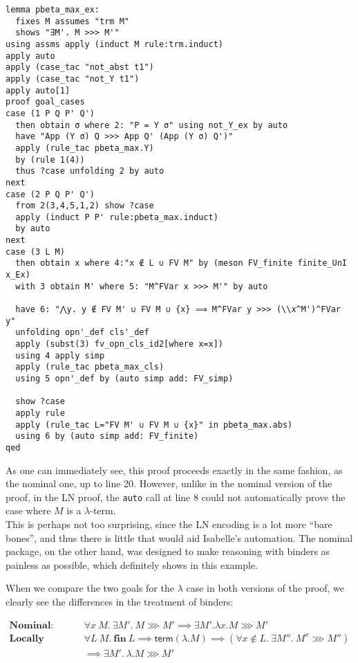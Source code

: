 \documentclass[a4paper, 12pt, twoside]{style/ociamthesis}
\theoremstyle{plain}
\theoremstyle{definition}
\theoremstyle{remark}
\newcommand{\trm}{\textsf{term}}
\begin{document}
\begin{verbatim}
lemma pbeta_max_ex:
  fixes M assumes "trm M"
  shows "∃M'. M >>> M'"
using assms apply (induct M rule:trm.induct)
apply auto
apply (case_tac "not_abst t1")
apply (case_tac "not_Y t1")
apply auto[1]
proof goal_cases
case (1 P Q P' Q')
  then obtain σ where 2: "P = Y σ" using not_Y_ex by auto
  have "App (Y σ) Q >>> App Q' (App (Y σ) Q')"
  apply (rule_tac pbeta_max.Y)
  by (rule 1(4))
  thus ?case unfolding 2 by auto
next
case (2 P Q P' Q')
  from 2(3,4,5,1,2) show ?case
  apply (induct P P' rule:pbeta_max.induct)
  by auto
next
case (3 L M)
  then obtain x where 4:"x ∉ L ∪ FV M" by (meson FV_finite finite_UnI x_Ex)
  with 3 obtain M' where 5: "M^FVar x >>> M'" by auto

  have 6: "⋀y. y ∉ FV M' ∪ FV M ∪ {x} ⟹ M^FVar y >>> (\\x^M')^FVar y"
  unfolding opn'_def cls'_def 
  apply (subst(3) fv_opn_cls_id2[where x=x])
  using 4 apply simp
  apply (rule_tac pbeta_max_cls)
  using 5 opn'_def by (auto simp add: FV_simp)

  show ?case
  apply rule
  apply (rule_tac L="FV M' ∪ FV M ∪ {x}" in pbeta_max.abs)
  using 6 by (auto simp add: FV_finite)
qed
\end{verbatim}

As one can immediately see, this proof proceeds exactly in the same
fashion, as the nominal one, up to line 20. However, unlike in the
nominal version of the proof, in the LN proof, the \texttt{auto} call at
line 8 could not automatically prove the case where \(M\) is a
\(\lambda\)-term.\\
This is perhaps not too surprising, since the LN encoding is a lot more
``bare bones'', and thus there is little that would aid Isabelle's
automation. The nominal package, on the other hand, was designed to make
reasoning with binders as painless as possible, which definitely shows
in this example.

When we compare the two goals for the \(\lambda\) case in both versions
of the proof, we clearly see the differences in the treatment of
binders:

\begin{center}
$\begin{aligned}
\textbf{Nominal:}\ \ &\forall x\ M.\ \exists M'.\ M \ggg M' \implies \exists M'. \lambda x. M \ggg M'\\
\textbf{Locally nameless:}\ \ &\forall L\ M.\ \textbf{fin}\ L \implies \trm(\lambda.M) \implies (\forall x \not\in L.\ \exists M''.\ M^x \ggg M'')\\
&\implies \exists M'.\ \lambda.M \ggg M'
\end{aligned}$
\end{center}
\end{document}
